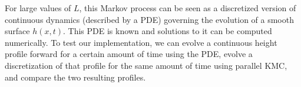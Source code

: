 \documentclass[12pt]{article}
\begin{document}
\begin{enumerate}
\par For large values of $L$, this Markov process can be seen as a discretized version of continuous dynamics (described by a PDE) governing the evolution of a smooth surface $h(x, t)$. This PDE is known and solutions to it can be computed numerically. To test our implementation, we can evolve a continuous height profile forward for a certain amount of time using the PDE, evolve a discretization of that profile for the same amount of time using parallel KMC, and compare the two resulting profiles. 




\end{enumerate}
\end{document}
